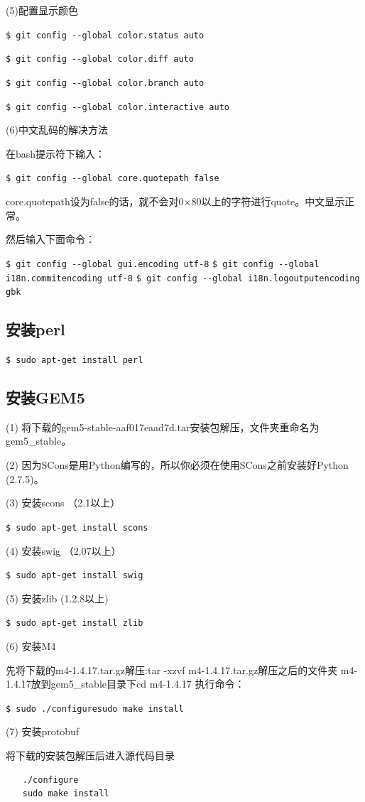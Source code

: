 (5)配置显示颜色

\verb"$ git config --global color.status auto"

\verb"$ git config --global color.diff auto"

\verb"$ git config --global color.branch auto"

\verb"$ git config --global color.interactive auto"

(6)中文乱码的解决方法

在bash提示符下输入：

\verb"$ git config --global core.quotepath false"

core.quotepath设为false的话，就不会对0×80以上的字符进行quote。中文显示正常。

然后输入下面命令：

\verb"$ git config --global gui.encoding utf-8"
\verb"$ git config --global i18n.commitencoding utf-8"
\verb"$ git config --global i18n.logoutputencoding gbk"

\subsection{安装perl}
\verb"$ sudo apt-get install perl"

\subsection{安装GEM5}
(1) 将下载的gem5-stable-aaf017eaad7d.tar安装包解压，文件夹重命名为gem5\_stable。

(2) 因为SCons是用Python编写的，所以你必须在使用SCons之前安装好Python (2.7.5)。

(3) 安装scons （2.1以上）

\verb"$ sudo apt-get install scons"

(4) 安装swig （2.07以上）

\verb"$ sudo apt-get install swig"

(5) 安装zlib (1.2.8以上)

\verb"$ sudo apt-get install zlib"

(6) 安装M4

先将下载的m4-1.4.17.tar.gz解压:tar -xzvf m4-1.4.17.tar.gz解压之后的文件夹 m4-1.4.17放到gem5\_stable目录下cd m4-1.4.17
执行命令：

\verb"$ sudo ./configuresudo make install"

(7) 安装protobuf

将下载的安装包解压后进入源代码目录
\begin{verbatim}
　　./configure
　　sudo make install
\end{verbatim}

